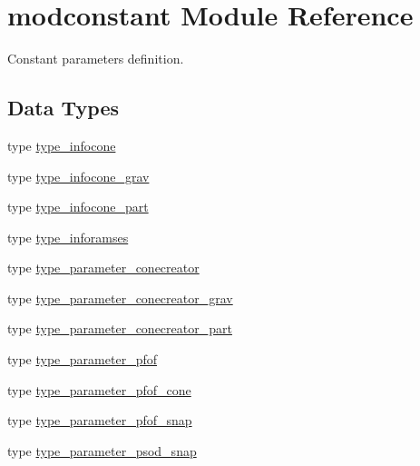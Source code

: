 \hypertarget{namespacemodconstant}{}\section{modconstant Module Reference}
\label{namespacemodconstant}


Constant parameters definition.  


\subsection*{Data Types}
\begin{DoxyCompactItemize}
\item 
type \hyperlink{structmodconstant_1_1type__infocone}{type\+\_\+infocone}
\item 
type \hyperlink{structmodconstant_1_1type__infocone__grav}{type\+\_\+infocone\+\_\+grav}
\item 
type \hyperlink{structmodconstant_1_1type__infocone__part}{type\+\_\+infocone\+\_\+part}
\item 
type \hyperlink{structmodconstant_1_1type__inforamses}{type\+\_\+inforamses}
\item 
type \hyperlink{structmodconstant_1_1type__parameter__conecreator}{type\+\_\+parameter\+\_\+conecreator}
\item 
type \hyperlink{structmodconstant_1_1type__parameter__conecreator__grav}{type\+\_\+parameter\+\_\+conecreator\+\_\+grav}
\item 
type \hyperlink{structmodconstant_1_1type__parameter__conecreator__part}{type\+\_\+parameter\+\_\+conecreator\+\_\+part}
\item 
type \hyperlink{structmodconstant_1_1type__parameter__pfof}{type\+\_\+parameter\+\_\+pfof}
\item 
type \hyperlink{structmodconstant_1_1type__parameter__pfof__cone}{type\+\_\+parameter\+\_\+pfof\+\_\+cone}
\item 
type \hyperlink{structmodconstant_1_1type__parameter__pfof__snap}{type\+\_\+parameter\+\_\+pfof\+\_\+snap}
\item 
type \hyperlink{structmodconstant_1_1type__parameter__psod__snap}{type\+\_\+parameter\+\_\+psod\+\_\+snap}
\end{DoxyCompactItemize}

